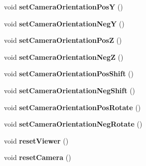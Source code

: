 \begin{DoxyCompactItemize}
\item 
void {\bfseries set\+Camera\+Orientation\+PosY} ()\hypertarget{class_main_window_a4980ce0a94fd49b25bf3d005bfaf4756}{}\label{class_main_window_a4980ce0a94fd49b25bf3d005bfaf4756}

\item 
void {\bfseries set\+Camera\+Orientation\+NegY} ()\hypertarget{class_main_window_a50b850ca17eb434ff702ea5e87b3cbfe}{}\label{class_main_window_a50b850ca17eb434ff702ea5e87b3cbfe}

\item 
void {\bfseries set\+Camera\+Orientation\+PosZ} ()\hypertarget{class_main_window_aa92b6d33b290f0be1c74d83bf2c20d20}{}\label{class_main_window_aa92b6d33b290f0be1c74d83bf2c20d20}

\item 
void {\bfseries set\+Camera\+Orientation\+NegZ} ()\hypertarget{class_main_window_a867a99f44d3f38b0fc273bb914123c5d}{}\label{class_main_window_a867a99f44d3f38b0fc273bb914123c5d}

\item 
void {\bfseries set\+Camera\+Orientation\+Pos\+Shift} ()\hypertarget{class_main_window_a9419db2007e9cb2fce7c47bad9a1e24d}{}\label{class_main_window_a9419db2007e9cb2fce7c47bad9a1e24d}

\item 
void {\bfseries set\+Camera\+Orientation\+Neg\+Shift} ()\hypertarget{class_main_window_a662365afb1e72acc14a3395454af2e53}{}\label{class_main_window_a662365afb1e72acc14a3395454af2e53}

\item 
void {\bfseries set\+Camera\+Orientation\+Pos\+Rotate} ()\hypertarget{class_main_window_a337c399d18112efcaaef73894041bbb7}{}\label{class_main_window_a337c399d18112efcaaef73894041bbb7}

\item 
void {\bfseries set\+Camera\+Orientation\+Neg\+Rotate} ()\hypertarget{class_main_window_a9aa0b2b560852435780f75c2b3f10f1f}{}\label{class_main_window_a9aa0b2b560852435780f75c2b3f10f1f}

\item 
void {\bfseries reset\+Viewer} ()\hypertarget{class_main_window_aad7276b3a2f667c813d8b4d00a6995d3}{}\label{class_main_window_aad7276b3a2f667c813d8b4d00a6995d3}

\item 
void {\bfseries reset\+Camera} ()\hypertarget{class_main_window_acdfade55a70d7cba0ba0dbea3d77d183}{}\label{class_main_window_acdfade55a70d7cba0ba0dbea3d77d183}


\end{DoxyCompactItemize}
